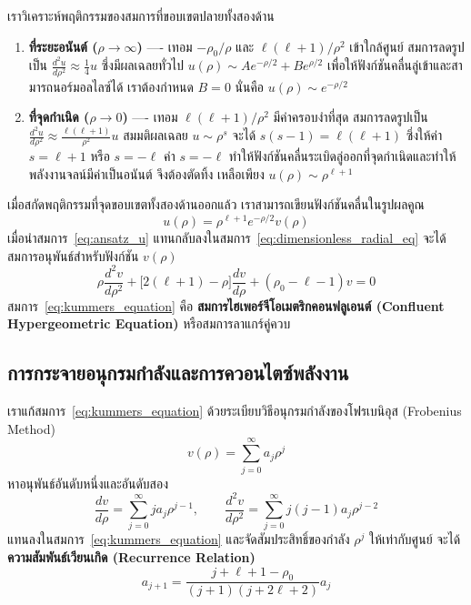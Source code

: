 เราวิเคราะห์พฤติกรรมของสมการที่ขอบเขตปลายทั้งสองด้าน
\begin{enumerate}
    \item \textbf{ที่ระยะอนันต์ ($\rho \to \infty$)} ---- เทอม $-\rho_0/\rho$ และ $\ell(\ell+1)/\rho^2$ เข้าใกล้ศูนย์ สมการลดรูปเป็น $\frac{d^2 u}{d\rho^2} \approx \frac{1}{4} u$ ซึ่งมีผลเฉลยทั่วไป $u(\rho) \sim A e^{-\rho/2} + B e^{\rho/2}$ เพื่อให้ฟังก์ชันคลื่นลู่เข้าและสามารถนอร์มอลไลซ์ได้ เราต้องกำหนด $B = 0$ นั่นคือ $u(\rho) \sim e^{-\rho/2}$
    \item \textbf{ที่จุดกำเนิด ($\rho \to 0$)} ---- เทอม $\ell(\ell+1)/\rho^2$ มีค่าครอบงำที่สุด สมการลดรูปเป็น $\frac{d^2 u}{d\rho^2} \approx \frac{\ell(\ell+1)}{\rho^2} u$ สมมติผลเฉลย $u \sim \rho^s$ จะได้ $s(s-1) = \ell(\ell+1)$ ซึ่งให้ค่า $s = \ell + 1$ หรือ $s = -\ell$ ค่า $s = -\ell$ ทำให้ฟังก์ชันคลื่นระเบิดลู่ออกที่จุดกำเนิดและทำให้พลังงานจลน์มีค่าเป็นอนันต์ จึงต้องตัดทิ้ง เหลือเพียง $u(\rho) \sim \rho^{\ell + 1}$
\end{enumerate}

เมื่อสกัดพฤติกรรมที่จุดขอบเขตทั้งสองด้านออกแล้ว เราสามารถเขียนฟังก์ชันคลื่นในรูปผลคูณ
\begin{equation}
u(\rho) = \rho^{\ell + 1} e^{-\rho/2} v(\rho)
\label{eq:ansatz_u}
\end{equation}
เมื่อนำสมการ~\eqref{eq:ansatz_u} แทนกลับลงในสมการ~\eqref{eq:dimensionless_radial_eq} จะได้สมการอนุพันธ์สำหรับฟังก์ชัน $v(\rho)$
\begin{equation}
\rho \frac{d^2 v}{d\rho^2} + \big[ 2(\ell + 1) - \rho \big] \frac{dv}{d\rho} + \left( \rho_0 - \ell - 1 \right) v = 0
\label{eq:kummers_equation}
\end{equation}
สมการ~\eqref{eq:kummers_equation} คือ \textbf{สมการไฮเพอร์จีโอเมตริกคอนฟลูเอนต์ (Confluent Hypergeometric Equation)} หรือสมการลาแกร์คู่ควบ

\subsection{การกระจายอนุกรมกำลังและการควอนไตซ์พลังงาน}
เราแก้สมการ~\eqref{eq:kummers_equation} ด้วยระเบียบวิธีอนุกรมกำลังของโฟรเบนิอุส (Frobenius Method)
\begin{equation}
v(\rho) = \sum_{j=0}^\infty a_j \rho^j
\end{equation}
หาอนุพันธ์อันดับหนึ่งและอันดับสอง
\begin{equation}
\frac{dv}{d\rho} = \sum_{j=0}^\infty j a_j \rho^{j-1}, \qquad \frac{d^2 v}{d\rho^2} = \sum_{j=0}^\infty j(j-1) a_j \rho^{j-2}
\end{equation}
แทนลงในสมการ~\eqref{eq:kummers_equation} และจัดสัมประสิทธิ์ของกำลัง $\rho^j$ ให้เท่ากับศูนย์ จะได้ \textbf{ความสัมพันธ์เวียนเกิด (Recurrence Relation)}
\begin{equation}
a_{j+1} = \frac{j + \ell + 1 - \rho_0}{(j + 1)(j + 2\ell + 2)} a_j
\label{eq:recurrence_relation}
\end{equation}

